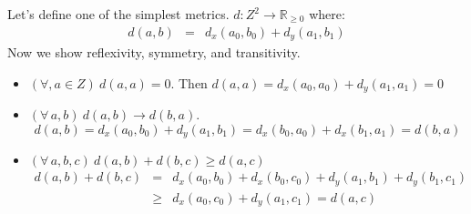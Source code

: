 \documentclass{article}
\begin{document}
Let's define one of the simplest metrics.
$d:Z^2 \rightarrow \mathbb{R}_{\geq 0}$ where:
\begin{eqnarray*}
d(a,b) &=& d_x(a_0,b_0) + d_y(a_1,b_1)
\end{eqnarray*}
Now we show reflexivity, symmetry, and transitivity.  
\begin{itemize}
\item $(\forall, a \in Z)\ d(a,a) = 0$.  Then $d(a,a) = d_x(a_0,a_0) + d_y(a_1,a_1) = 0$  
\item $(\forall\, a, b)\ d(a,b) \rightarrow d(b,a)$.    
\[ d(a,b) = d_x(a_0,b_0) + d_y(a_1,b_1) = d_x(b_0,a_0) + d_x(b_1,a_1) = d(b,a) \]
\item $(\forall\, a,b,c)\ d(a,b) + d(b,c) \geq d(a,c)$
\begin{eqnarray*}
d(a,b) + d(b,c) &=& d_x(a_0,b_0) + d_x(b_0,c_0) + d_y(a_1,b_1) + d_y(b_1,c_1)\\
&\geq& d_x(a_0,c_0) + d_y(a_1,c_1) = d(a,c)\\
\end{eqnarray*}
\end{itemize} 
\end{document}
